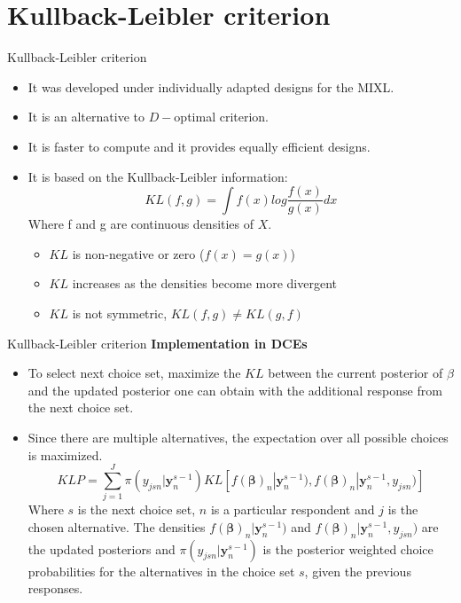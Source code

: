 \documentclass[11pt,t]{beamer}
\begin{document}

\section{Kullback-Leibler criterion}

\begin{frame}[fragile]{Kullback-Leibler criterion}
	\begin{itemize}
		\item It was developed under individually adapted designs for the MIXL.
		\item It is an alternative to $D-$optimal criterion.
		\item It is faster to compute and it provides equally efficient designs.
		\item It is based on the Kullback-Leibler information:
		$$KL(f,g) = \int f(x) log \frac{f(x)}{g(x)}dx$$
		Where f and g are continuous densities of $X$.
		\begin{itemize}
			\item $KL$ is non-negative or zero ($f(x)=g(x)$)
			\item $KL$ increases as the densities become more divergent
			\item $KL$ is not symmetric, $KL(f,g) \neq KL(g,f)$
		\end{itemize}
	\end{itemize}
\end{frame}

\begin{frame}[fragile]{Kullback-Leibler criterion}
\textbf{Implementation in DCEs}
\begin{itemize}
	\item To select next choice set, maximize the $KL$ between the current posterior of $\beta$ and the updated posterior one can obtain with the additional response from the next choice set.
	\item Since there are multiple alternatives, the expectation over all possible choices is maximized.
	\vspace*{-2mm}
	$$KLP = \sum_{j=1}^J \pi (y_{jsn}|\mathbf{y}_n^{s-1}) KL\left[f(\pmb{\beta})_n|\mathbf{y}_n^{s-1}), f(\pmb{\beta})_n|\mathbf{y}_n^{s-1},y_{jsn})\right]$$
	Where $s$ is the next choice set, $n$ is a particular respondent and $j$ is the chosen alternative. The densities $f(\pmb{\beta})_n|\mathbf{y}_n^{s-1})$ and $f(\pmb{\beta})_n|\mathbf{y}_n^{s-1},y_{jsn})$ are the updated posteriors and $\pi (y_{jsn}|\mathbf{y}_n^{s-1})$ is the posterior weighted choice probabilities for the alternatives in the choice set $s$, given the previous responses.
\end{itemize}
\end{frame}
\end{document}

